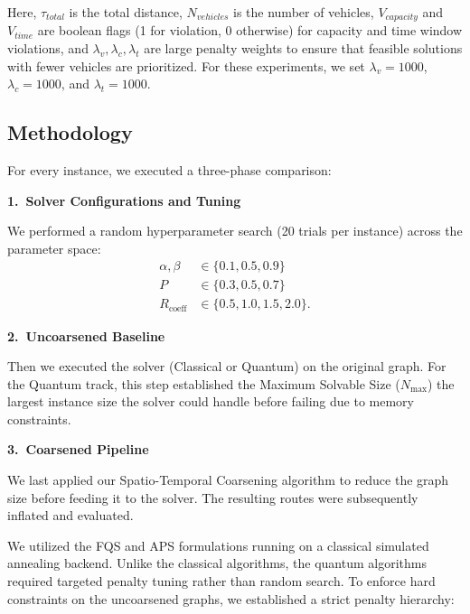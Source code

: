\documentclass[conference]{IEEEtran}
\begin{document}
Here, $\tau_{total}$ is the total distance, $N_{vehicles}$ is the number of vehicles, $V_{capacity}$ and $V_{time}$ are boolean flags (1 for violation, 0 otherwise) for capacity and time window violations, and $\lambda_{v}, \lambda_{c}, \lambda_{t}$ are large penalty weights to ensure that feasible solutions with fewer vehicles are prioritized. For these experiments, we set $\lambda_{v}=1000$, $\lambda_{c}=1000$, and $\lambda_{t}=1000$.


\subsection{Methodology}

For every instance, we executed a three-phase comparison:

\textbf{1.\ Solver Configurations and Tuning}

We performed a random hyperparameter search (20 trials per instance) across the parameter space:
\[
\begin{aligned}
\alpha, \beta &\in \{0.1, 0.5, 0.9\} \qquad
\\P &\in \{0.3, 0.5, 0.7\} \\R_{\text{coeff}} &\in \{0.5, 1.0, 1.5, 2.0\}.
\end{aligned}
\]

\textbf{2.\ Uncoarsened Baseline}

Then we executed the solver (Classical or Quantum) on the original graph. For the Quantum track, this step established the Maximum Solvable Size ($N_{\max}$) the largest instance size the solver could handle before failing due to memory constraints.

\textbf{3.\ Coarsened Pipeline}

We last applied our Spatio-Temporal Coarsening algorithm to reduce the graph size before feeding it to the solver. The resulting routes were subsequently inflated and evaluated.





We utilized the FQS and APS formulations running on a classical simulated annealing backend. Unlike the classical algorithms, the quantum algorithms required targeted penalty tuning rather than random search. To enforce hard constraints on the uncoarsened graphs, we established a strict penalty hierarchy:
\end{document}
